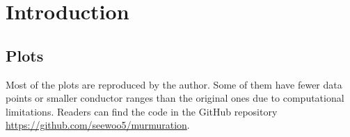 \section{Introduction}
\label{sec:intro}


\subsection{Plots}

Most of the plots are reproduced by the author.
Some of them have fewer data points or smaller conductor ranges than the original ones due to computational limitations.
Readers can find the code in the GitHub repository \url{https://github.com/seewoo5/murmuration}.
